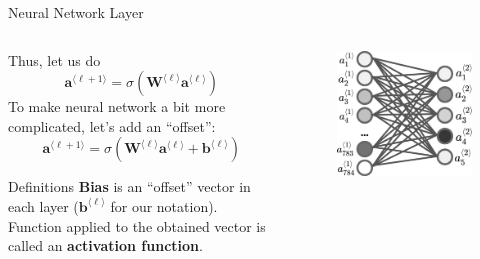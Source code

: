 \documentclass{beamer}
\begin{document}
    \begin{frame}{Neural Network Layer}
        \begin{columns}
        \begin{column}{0.7\textwidth}
        Thus, let us do
        \[
        \mathbf{a}^{\langle\ell+1\rangle} = \sigma\left(\mathbf{W}^{\langle \ell\rangle}\mathbf{a}^{\langle\ell\rangle}\right)
        \]
        To make neural network a bit more complicated, let's add an ``offset'':
        \[
        \mathbf{a}^{\langle\ell+1\rangle} = \sigma\left(\mathbf{W}^{\langle \ell\rangle}\mathbf{a}^{\langle\ell\rangle} + \mathbf{b}^{\langle\ell\rangle}\right)
        \]

        \begin{block}{Definitions}
            \textbf{Bias} is an ``offset'' vector in each layer ($\mathbf{b}^{\langle\ell\rangle}$ for our notation). Function applied to the obtained vector is called an \textbf{activation function}.
        \end{block} 
        \end{column}

        \begin{column}{0.3\textwidth}
        \begin{figure}
        \centering
            \includegraphics[width=\textwidth]{images/presentation/layer_all_all.png}
        \end{figure}
        \end{column}
        \end{columns}
    \end{frame}
\end{document}
